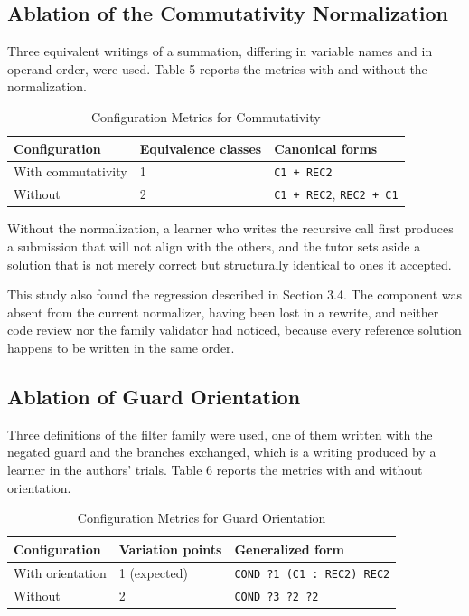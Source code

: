 \documentclass[10pt,twocolumn,letterpaper]{article}
\begin{document}
\subsection{Ablation of the Commutativity Normalization}
Three equivalent writings of a summation, differing in variable names
and in operand order, were used. Table 5 reports the metrics with and
without the normalization.

\begin{table}[h]
\centering\scriptsize
\caption{Configuration Metrics for Commutativity}
\begin{tabular}{@{}p{1.0in}p{0.9in}p{1.1in}@{}}
\toprule
Configuration & Equivalence classes & Canonical forms \\
\midrule
With commutativity & 1 & \texttt{C1 + REC2} \\
Without & 2 & \texttt{C1 + REC2}, \texttt{REC2 + C1} \\
\bottomrule
\end{tabular}
\end{table}

Without the normalization, a learner who writes the recursive call first
produces a submission that will not align with the others, and the tutor
sets aside a solution that is not merely correct but structurally
identical to ones it accepted.

This study also found the regression described in Section 3.4. The
component was absent from the current normalizer, having been lost in a
rewrite, and neither code review nor the family validator had noticed,
because every reference solution happens to be written in the same
order.

\subsection{Ablation of Guard Orientation}
Three definitions of the filter family were used, one of them written
with the negated guard and the branches exchanged, which is a writing
produced by a learner in the authors' trials. Table 6 reports the
metrics with and without orientation.

\begin{table}[h]
\centering\scriptsize
\caption{Configuration Metrics for Guard Orientation}
\begin{tabular}{lll}
\toprule
Configuration & Variation points & Generalized form \\
\midrule
With orientation & 1 (expected) & \texttt{COND ?1 (C1 : REC2) REC2} \\
Without & 2 & \texttt{COND ?3 ?2 ?2} \\
\bottomrule
\end{tabular}
\end{table}
\end{document}
